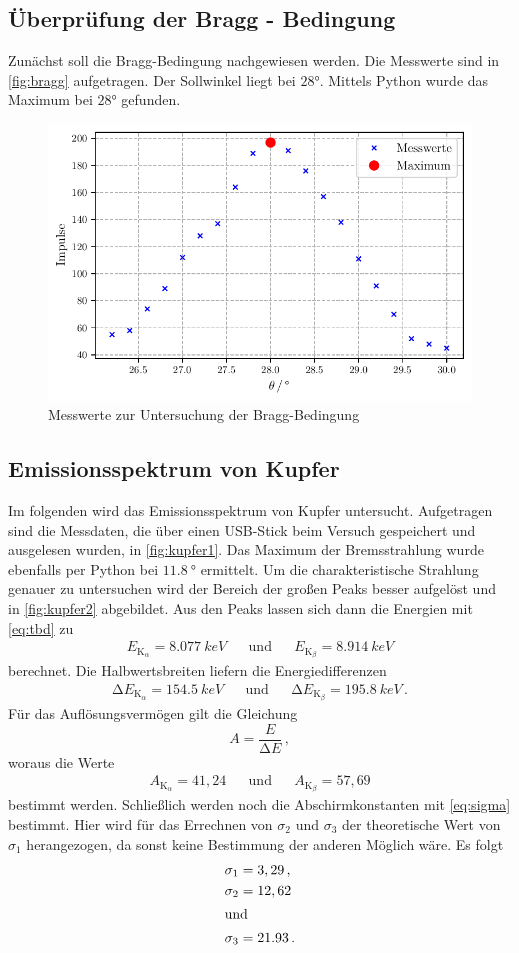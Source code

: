 \subsection{Überprüfung der Bragg - Bedingung}
Zunächst soll die Bragg-Bedingung nachgewiesen werden.
Die Messwerte sind in \autoref{fig:bragg} aufgetragen.
Der Sollwinkel liegt bei $28°$.
Mittels Python wurde das Maximum bei $28°$ gefunden.

\begin{figure}
  \centering
  \caption{Messwerte zur Untersuchung der Bragg-Bedingung}
  \label{fig:bragg}
  \includegraphics[width=0.5 \linewidth]{build/bragg.pdf}
\end{figure}

\subsection{Emissionsspektrum von Kupfer}
Im folgenden wird das Emissionsspektrum von Kupfer untersucht.
Aufgetragen sind die Messdaten, die über einen USB-Stick beim Versuch gespeichert und ausgelesen wurden, in \autoref{fig:kupfer1}.
Das Maximum der Bremsstrahlung wurde ebenfalls per Python bei $\qty{11.8}{°}$ ermittelt.  
Um die charakteristische Strahlung genauer zu untersuchen wird der Bereich der großen Peaks besser aufgelöst und in \autoref{fig:kupfer2} abgebildet.
Aus den Peaks lassen sich dann die Energien mit \autoref{eq:tbd} zu
\begin{align*}
  E_{\text{K}_\alpha} = \qty{8.077}{keV} &&\text{und}&& E_{\text{K}_\beta} = \qty{8.914}{keV}
\end{align*}
berechnet.
Die Halbwertsbreiten liefern die Energiedifferenzen
\begin{align*}
  \increment E_{\text{K}_\alpha} = \qty{154.5}{keV} &&\text{und}&& \increment E_{\text{K}_\beta} = \qty{195.8}{keV} \, .
\end{align*}
Für das Auflösungsvermögen gilt die Gleichung
\begin{equation*}
  A = \frac{E}{\increment E} \, ,
\end{equation*}
woraus die Werte
\begin{align*}
  A_{\text{K}_\alpha} = 41,24 && \text{und} && A_{\text{K}_\beta} = 57,69
\end{align*}
bestimmt werden.
Schließlich werden noch die Abschirmkonstanten mit \autoref{eq:sigma} bestimmt.
Hier wird für das Errechnen von $\sigma_2$ und $\sigma_3$ der theoretische Wert von $\sigma_1$ herangezogen, da sonst keine Bestimmung der anderen Möglich wäre. 
Es folgt
\begin{align*}
  \sigma_{1} &= 3,29 \, ,\\
  \sigma_{2} &= 12,62 \\ 
  \intertext{und}
  \sigma_{3} &= 21.93 \, .
\end{align*}


